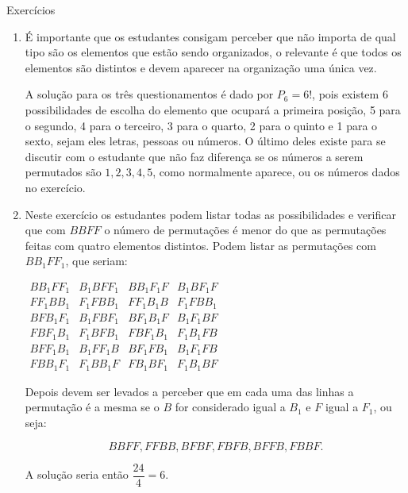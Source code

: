 \clearpage
\def\currentcolor{cor1}
\begin{answer}{Exercícios}
{\exerciselist
\begin{enumerate}
\item É importante que os estudantes consigam perceber que não importa de qual tipo são os  elementos que estão sendo organizados, o relevante é que todos os elementos são distintos e devem aparecer na organização uma única vez. 

A solução para os três questionamentos é dado por $P_6 =6!$, pois existem 6 possibilidades de escolha do elemento que ocupará a primeira posição, 5 para o segundo, 4 para o terceiro, 3 para o quarto, 2 para o quinto e 1 para o sexto, sejam eles letras, pessoas ou números.
O último deles existe para se discutir com o estudante que não faz diferença se os números a serem permutados são $1, 2, 3, 4, 5$, como normalmente aparece, ou os números dados no exercício.

\item Neste exercício os estudantes podem listar todas as possibilidades e verificar que com $BBFF$ o número de permutações é menor do que as permutações feitas com quatro elementos distintos. Podem listar as permutações com $BB_1FF_1$, que seriam:
\begin{table}[H]
\centering
\small

$\begin{array}{cccc} BB_1FF_1 & B_1BFF_1 & BB_1F_1F & B_1BF_1F \\ 
FF_1BB_1  & F_1FBB_1  & FF_1 B_1B  & F_1FBB_1 \\
    
BFB_1F_1 & B_1FBF_1&  BF_1B_1F& B_1F_1BF \\

FBF_1B_1  &  F_1BFB_1  &  FBF_1B_1  & F_1B_1FB \\

    BFF_1B_1  &B_1FF_1B  & BF_1FB_1  & B_1F_1FB \\
    
    FBB_1F_1  & F_1BB_1F &  FB_1BF_1 & F_1B_1BF
\end{array}$
\end{table}
Depois devem ser levados a perceber que em cada uma das linhas a permutação é a mesma se o $B$ for considerado igual a $B_1$ e $F$ igual a $F_1$, ou seja: 

\small
$$BBFF, FFBB, BFBF, FBFB, BFFB, FBBF. $$ 
\normalsize

A solução seria então $\dfrac{24}{4} =6. $


\end{enumerate}}
\end{answer}
